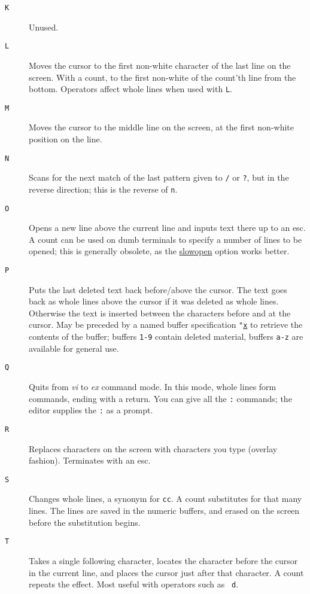 \begin{description}
\item[{\tt K}] Unused.

\item[{\tt L}] Moves the cursor to the first non-white character of the last
line on the screen. With a count, to the first non-white of the count'th line
from the bottom. Operators affect whole lines when used with {\tt L}.

\item[{\tt M}] Moves the cursor to the middle line on the screen, at the first
non-white position on the line.

\item[{\tt N}] Scans for the next match of the last pattern given to {\tt /}
or {\tt ?}, but in the reverse direction; this is the reverse of {\tt n}.

\item[{\tt O}] Opens a new line above the current line and inputs text there
up to an {\sc esc}. A count can be used on dumb terminals to specify a number
of lines to be opened; this is generally obsolete, as the \ul{slowopen} option
works better.

\item[{\tt P}] Puts the last deleted text back before/above the cursor. The
text goes back as whole lines above the cursor if it was deleted as whole
lines. Otherwise the text is inserted between the characters before and at the
cursor. May be preceded by a named buffer specification {\tt "\ul{x}} to
retrieve the contents of the buffer; buffers {\tt 1-9} contain deleted
material, buffers {\tt a-z} are available for general use.

\item[{\tt Q}] Quits from {\it vi\/} to {\it ex} command mode. In this mode,
whole lines form commands, ending with a {\sc return}. You can give all the
{\tt :} commands; the editor supplies the {\tt :} as a prompt.

\item[{\tt R}] Replaces characters on the screen with characters you type
(overlay fashion). Terminates with an {\sc esc}.

\item[{\tt S}] Changes whole lines, a synonym for {\tt cc}. A count
substitutes for that many lines. The lines are saved in the numeric buffers,
and erased on the screen before the substitution begins.

\item[{\tt T}] Takes a single following character, locates the character
before the cursor in the current line, and places the cursor just after that
character. A count repeats the effect. Most useful with operators such as {\tt
d}.


\end{description}
